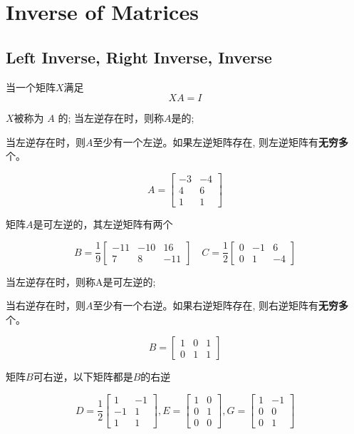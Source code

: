 \chapter{Inverse of Matrices}

\section{Left Inverse, Right Inverse, Inverse}

\begin{definition}[$A$的左逆]
    当一个矩阵$X$满足 $$ X A=I $$ 
    
    $X$被称为 $ A $ 的; 当左逆存在时，则称$A$是的;
\end{definition}

当左逆存在时，则$A$至少有一个左逆。如果左逆矩阵存在, 则左逆矩阵有\textbf{无穷多}个。

\begin{example}
    $$ A=\left[\begin{array}{cc}-3 & -4 \\ 4 & 6 \\ 1 & 1\end{array}\right] $$

    矩阵$A$是可左逆的，其左逆矩阵有两个

    $$ B=\frac{1}{9}\left[\begin{array}{ccc}-11 & -10 & 16 \\ 7 & 8 & -11\end{array}\right] \quad C=\frac{1}{2}\left[\begin{array}{ccc}0 & -1 & 6 \\ 0 & 1 & -4\end{array}\right] $$
\end{example}

\begin{definition}[$A$的右逆]
    当左逆存在时，则称A是可左逆的;
\end{definition}

当右逆存在时，则$A$至少有一个右逆。如果右逆矩阵存在, 则右逆矩阵有\textbf{无穷多}个。


\begin{example}
    $$ B=\left[\begin{array}{lll}1 & 0 & 1 \\ 0 & 1 & 1\end{array}\right] $$

    矩阵$B$可右逆，以下矩阵都是$B$的右逆

    $$ D=\frac{1}{2}\left[\begin{array}{cc}1 & -1 \\ -1 & 1 \\ 1 & 1\end{array}\right], E=\left[\begin{array}{ll}1 & 0 \\ 0 & 1 \\ 0 & 0\end{array}\right], G=\left[\begin{array}{cc}1 & -1 \\ 0 & 0 \\ 0 & 1\end{array}\right] $$
\end{example}

